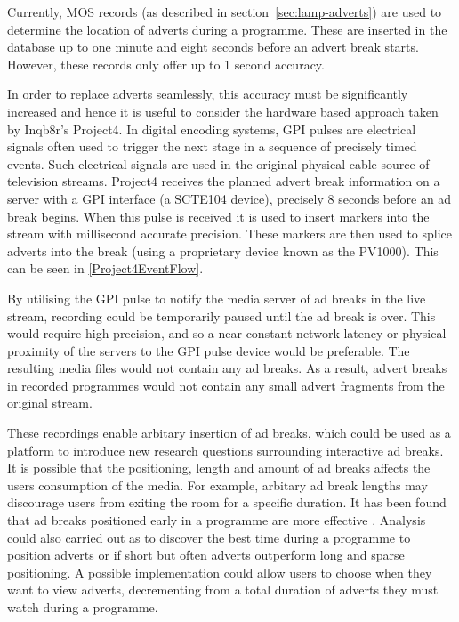 	Currently, MOS records (as described in section~\ref{sec:lamp-adverts}) are used to determine the location of adverts during a programme. These are inserted in the database up to one minute and eight seconds before an advert break starts. However, these records only offer up to 1 second accuracy.

	In order to replace adverts seamlessly, this accuracy must be significantly increased and hence it is useful to consider the hardware based approach taken by Inqb8r's Project4. In digital encoding systems, GPI pulses are electrical signals often used to trigger the next stage in a sequence of precisely timed events. Such electrical signals are used in the original physical cable source of television streams. Project4 receives the planned advert break information on a server with a GPI interface (a SCTE104 device\citep{SCTE104}), precisely 8 seconds before an ad break begins. When this pulse is received it is used to insert markers into the stream with millisecond accurate precision. These markers are then used to splice adverts into the break (using a proprietary device known as the PV1000). This can be seen in \ref{Project4EventFlow}.

	By utilising the GPI pulse to notify the media server of ad breaks in the live stream, recording could be temporarily paused until the ad break is over. This would require high precision, and so a near-constant network latency or physical proximity of the servers to the GPI pulse device would be preferable. The resulting media files would not contain any ad breaks. As a result, advert breaks in recorded programmes would not contain any small advert fragments from the original stream.

	These recordings enable arbitary insertion of ad breaks, which could be used as a platform to introduce new research questions surrounding interactive ad breaks. It is possible that the positioning, length and amount of ad breaks affects the users consumption of the media. For example, arbitary ad break lengths may discourage users from exiting the room for a specific duration. It has been found that ad breaks positioned early in a programme are more effective \citep{jeong2011position}. Analysis could also carried out as to discover the best time during a programme to position adverts or if short but often adverts outperform long and sparse positioning. A possible implementation could allow users to choose when they want to view adverts, decrementing from a total duration of adverts they must watch during a programme.

